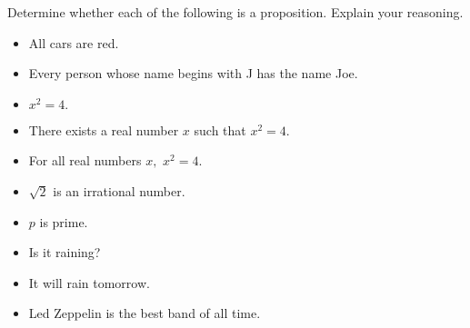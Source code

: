 \documentclass{ximera}
\begin{document}
\begin{br}
  Determine whether each of the following is a proposition. Explain your reasoning.

  \begin{itemize}
    \item All cars are red.
    \item Every person whose name begins with J has the name Joe.
    \item $x^2=4.$
    \item There exists a real number $x$ such that $x^2=4$.
    \item For all real numbers $x,$ $x^2=4.$
    \item $\sqrt{2}$ is an irrational number.
    \item $p$ is prime.
    \item Is it raining?
    \item It will rain tomorrow.
    \item Led Zeppelin is the best band of all time.
  \end{itemize}
\end{br}
\end{document}
